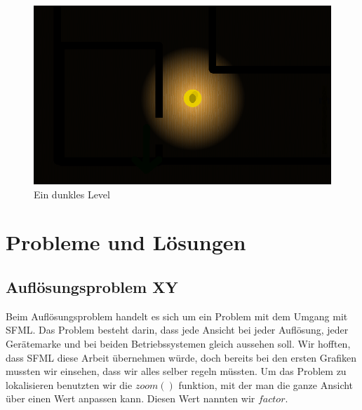 \documentclass[12pt,a4paper]{scrartcl}
\begin{document}
\begin{figure}[h]
\centering
\includegraphics[scale=0.5]{img/dunkel.png}
\caption{Ein dunkles Level}
\end{figure}
\newpage


\section{Probleme und Lösungen}
\subsection{Auflösungsproblem XY}
\label{aufloesungsprobleme}
Beim Auflösungsproblem handelt es sich um ein Problem mit dem Umgang mit SFML.
Das Problem besteht darin, dass jede Ansicht bei jeder Auflösung, jeder Gerätemarke und bei beiden Betriebssystemen gleich aussehen soll.
Wir hofften, dass SFML diese Arbeit übernehmen würde, doch bereits bei den ersten Grafiken mussten wir einsehen, dass wir alles selber regeln müssten.
Um das Problem zu lokalisieren benutzten wir die $zoom()$ funktion, mit der man die ganze Ansicht über einen Wert anpassen kann.
Diesen Wert nannten wir $factor$.
\end{document}
